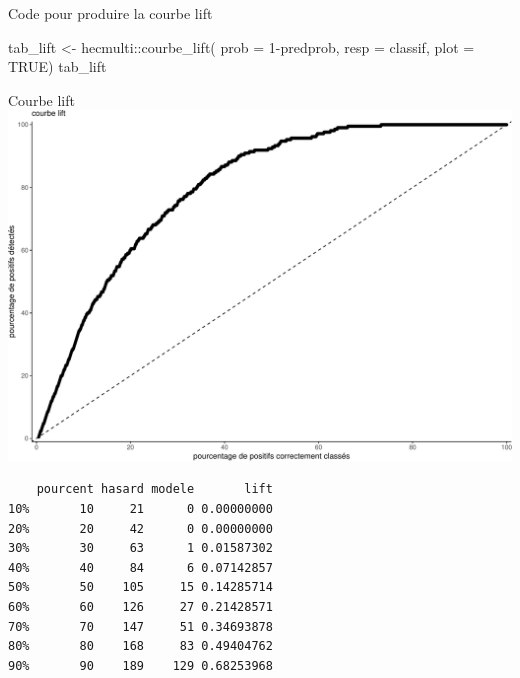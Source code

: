 \documentclass[
  ignorenonframetext,
]{beamer}
\newenvironment{Shaded}{\begin{snugshade}}{\end{snugshade}}
\newcommand{\AttributeTok}[1]{\textcolor[rgb]{0.40,0.45,0.13}{#1}}
\newcommand{\ConstantTok}[1]{\textcolor[rgb]{0.56,0.35,0.01}{#1}}
\newcommand{\DecValTok}[1]{\textcolor[rgb]{0.68,0.00,0.00}{#1}}
\newcommand{\FunctionTok}[1]{\textcolor[rgb]{0.28,0.35,0.67}{#1}}
\newcommand{\NormalTok}[1]{\textcolor[rgb]{0.00,0.23,0.31}{#1}}
\newcommand{\OtherTok}[1]{\textcolor[rgb]{0.00,0.23,0.31}{#1}}
\newcommand{\SpecialCharTok}[1]{\textcolor[rgb]{0.37,0.37,0.37}{#1}}
\begin{document}
\begin{frame}[fragile]{Code pour produire la courbe lift}
\protect\hypertarget{code-pour-produire-la-courbe-lift}{}
\begin{Shaded}
\begin{Highlighting}[numbers=left,,]
\NormalTok{tab\_lift }\OtherTok{\textless{}{-}}\NormalTok{ hecmulti}\SpecialCharTok{::}\FunctionTok{courbe\_lift}\NormalTok{(}
  \AttributeTok{prob =} \DecValTok{1}\SpecialCharTok{{-}}\NormalTok{predprob,}
  \AttributeTok{resp =}\NormalTok{ classif, }
  \AttributeTok{plot =} \ConstantTok{TRUE}\NormalTok{)}
\NormalTok{tab\_lift}
\end{Highlighting}
\end{Shaded}
\end{frame}

\begin{frame}[fragile]{Courbe lift}
\protect\hypertarget{courbe-lift-1}{}
\includegraphics{MATH60602-diapos7_files/figure-beamer/figcourbe-lift-pr-1.pdf}

\begin{verbatim}
    pourcent hasard modele       lift
10%       10     21      0 0.00000000
20%       20     42      0 0.00000000
30%       30     63      1 0.01587302
40%       40     84      6 0.07142857
50%       50    105     15 0.14285714
60%       60    126     27 0.21428571
70%       70    147     51 0.34693878
80%       80    168     83 0.49404762
90%       90    189    129 0.68253968
\end{verbatim}
\end{frame}
\end{document}
